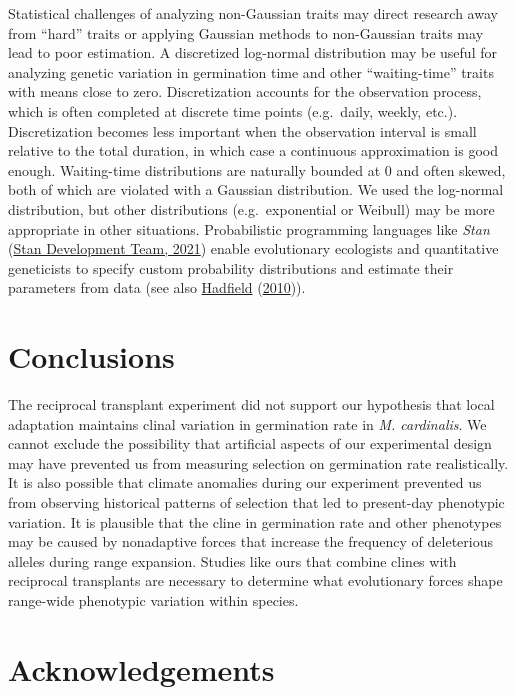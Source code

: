 \documentclass[
  12pt,
]{article}
\begin{document}
Statistical challenges of analyzing non-Gaussian traits may direct research away from ``hard'' traits or applying Gaussian methods to non-Gaussian traits may lead to poor estimation. A discretized log-normal distribution may be useful for analyzing genetic variation in germination time and other ``waiting-time'' traits with means close to zero. Discretization accounts for the observation process, which is often completed at discrete time points (e.g.~daily, weekly, etc.). Discretization becomes less important when the observation interval is small relative to the total duration, in which case a continuous approximation is good enough. Waiting-time distributions are naturally bounded at 0 and often skewed, both of which are violated with a Gaussian distribution. We used the log-normal distribution, but other distributions (e.g.~exponential or Weibull) may be more appropriate in other situations. Probabilistic programming languages like \emph{Stan} (\protect\hyperlink{ref-stan_development_team_stan_2021}{Stan Development Team, 2021}) enable evolutionary ecologists and quantitative geneticists to specify custom probability distributions and estimate their parameters from data (see also \protect\hyperlink{ref-hadfield_mcmc_2010}{Hadfield} (\protect\hyperlink{ref-hadfield_mcmc_2010}{2010})).

\hypertarget{conclusions}{%
\section{Conclusions}\label{conclusions}}

The reciprocal transplant experiment did not support our hypothesis that local adaptation maintains clinal variation in germination rate in \emph{M. cardinalis}. We cannot exclude the possibility that artificial aspects of our experimental design may have prevented us from measuring selection on germination rate realistically. It is also possible that climate anomalies during our experiment prevented us from observing historical patterns of selection that led to present-day phenotypic variation. It is plausible that the cline in germination rate and other phenotypes may be caused by nonadaptive forces that increase the frequency of deleterious alleles during range expansion. Studies like ours that combine clines with reciprocal transplants are necessary to determine what evolutionary forces shape range-wide phenotypic variation within species.

\hypertarget{acknowledgements}{%
\section{Acknowledgements}\label{acknowledgements}}
\end{document}
